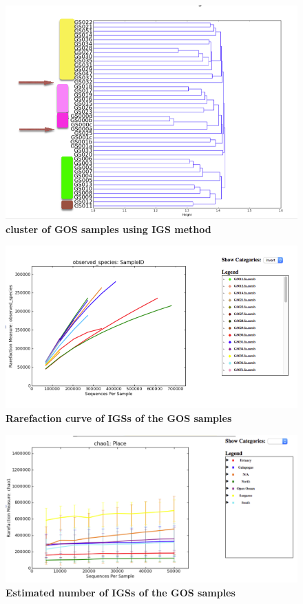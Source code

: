 \documentclass[12pt]{report}
\begin{document}
\begin{figure}[!ht]
 \centerline{\includegraphics[width=7in]{./figures/GOS_cluster.png}}
\caption{\bf cluster of GOS samples using IGS method}
\label{fig:GOS-beta}
\end{figure}

\begin{figure}[!ht]
 \centerline{\includegraphics[width=7in]{./figures/GOS_observed.png}}
\caption{\bf Rarefaction curve of IGSs of the GOS samples}
\label{fig:GOS-rarefaction}
\end{figure}

\begin{figure}[!ht]
 \centerline{\includegraphics[width=7in]{./figures/GOS_chao.png}}
\caption{\bf Estimated number of IGSs of the GOS samples}
\label{fig:GOS-chao1}
\end{figure}
\end{document}
